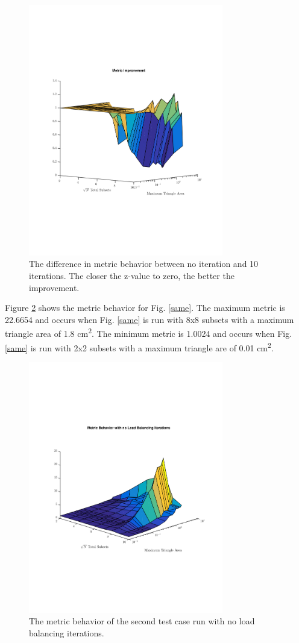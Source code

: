 \documentclass{anstrans}
\begin{document}
\begin{figure}
\centering
\includegraphics[width=85mm, trim = 0cm 5cm 0cm 5cm,clip]{figures/OppDiff.pdf}
\caption{The difference in metric behavior between no iteration and 10 iterations. The closer the z-value to zero, the better the improvement.}
\label{oppdiff}
\end{figure}

Figure \ref{samenoiter} shows the metric behavior for Fig. \ref{same}. The maximum metric is 22.6654 and occurs when Fig. \ref{same} is run with 8x8 subsets with a maximum triangle area of 1.8 cm\textsuperscript{2}. The minimum metric is 1.0024 and occurs when Fig. \ref{same} is run with 2x2 subsets with a maximum triangle are of 0.01 cm\textsuperscript{2}.

\begin{figure}
\centering
\includegraphics[width=85mm, trim = 2cm 5cm 0cm 5cm,clip]{figures/SameNoIter.pdf}
\caption{The metric behavior of the second test case run with no load balancing iterations.}
\label{samenoiter}
\end{figure}
\end{document}
